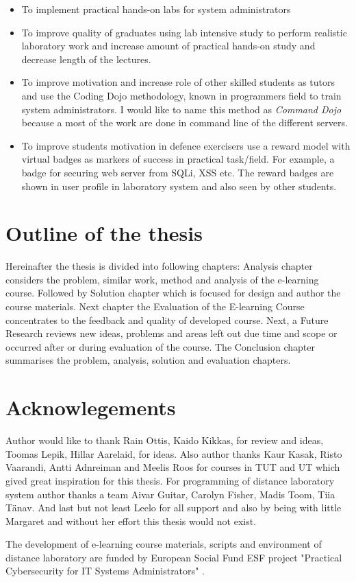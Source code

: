 \begin{itemize}
\item To implement practical hands-on labs for system administrators
\item To improve quality of graduates using lab intensive study  to perform realistic laboratory work and increase amount of practical hands-on study and decrease length of the lectures.
\item To improve motivation and increase role of other skilled students as tutors and use the \gls{Coding Dojo} methodology, known in programmers field to train system administrators. I would like to name this method as \emph{Command Dojo} because a most of the work are done in command line of the different servers.
\item To improve students motivation in defence exercisers use a reward model with virtual badges as markers of success in practical task/field. For example, a badge for securing web server from \gls{SQLi}, \gls{XSS} etc. The reward badges are shown in user profile in laboratory system and also seen by other students.
\end{itemize}
\par


\section{Outline of the thesis}
Hereinafter the thesis is divided into following chapters: Analysis chapter considers the problem, similar work, method and analysis of the e-learning course. Followed by Solution chapter which is focused for design and author the course materials. Next chapter the Evaluation of the E-learning Course concentrates to the feedback and quality of developed course. Next, a Future Research reviews new ideas, problems and areas left out due time and scope or occurred after or during evaluation of the course. The Conclusion chapter summarises the problem, analysis, solution and evaluation chapters.



\section{Acknowlegements}
Author would like to thank Rain Ottis, Kaido Kikkas, for review and ideas, Toomas Lepik, Hillar Aarelaid, for ideas. Also author thanks Kaur Kasak, Risto Vaarandi, Antti Adnreiman and Meelis Roos for courses in TUT and UT which gived great inspiration for this thesis. For programming of distance laboratory system author thanks a team Aivar Guitar, Carolyn Fisher, Madis Toom, Tiia Tänav. And last but not least Leelo for all support and also by being with little Margaret and without her effort this thesis would not exist.

The development of e-learning course materials, scripts and environment of distance laboratory are funded by European Social Fund \gls{ESF} project "Practical Cybersecurity for IT Systems Administrators" \citep{website:ESF_project}.

